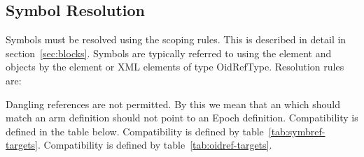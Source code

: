 \subsection{Symbol Resolution}
\label{sec:ref-symbol-resolution}

Symbols must be resolved using the scoping rules. This is described in
detail in section~\ref{sec:blocks}. Symbols are typically referred to
using the  element and objects by the  element
or XML elements of type OidRefType. Resolution rules are:

\begin{valrules}
Dangling references are not permitted.
 By this we mean that an 
which should match an arm definition should not point to an Epoch
definition. Compatibility is defined in the table below.
 Compatibility is
defined by table~\ref{tab:symbref-targets}.  
 Compatibility is
defined by table~\ref{tab:oidref-targets}.  
\end{valrules}

